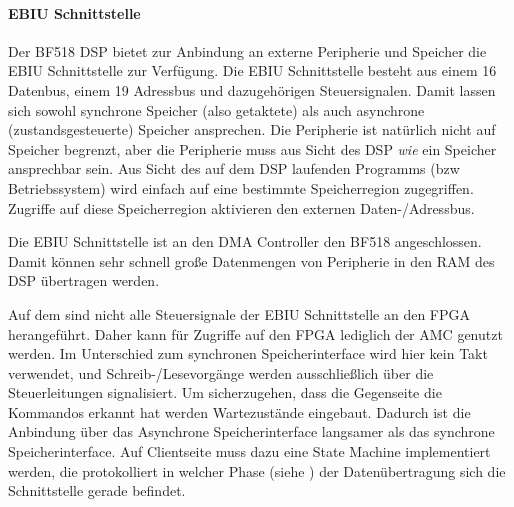 
\paragraph{EBIU Schnittstelle}
Der BF518 DSP bietet zur Anbindung an externe Peripherie und Speicher die \gls{EBIU} Schnittstelle zur Verfügung. Die EBIU Schnittstelle besteht aus einem \SI{16}{\bit} Datenbus, einem \SI{19}{\bit} Adressbus und dazugehörigen Steuersignalen. Damit lassen sich sowohl synchrone Speicher (also getaktete) als auch asynchrone (zustandsgesteuerte) Speicher ansprechen. Die Peripherie ist natürlich nicht auf Speicher begrenzt, aber die Peripherie muss aus Sicht des DSP \emph{wie} ein Speicher ansprechbar sein. Aus Sicht des auf dem DSP laufenden Programms (bzw Betriebssystem) wird einfach auf eine bestimmte Speicherregion zugegriffen. Zugriffe auf diese Speicherregion aktivieren den externen Daten-/Adressbus.

Die EBIU Schnittstelle ist an den \gls{DMA} Controller den BF518 angeschlossen. Damit können sehr schnell große Datenmengen von Peripherie in den RAM des DSP übertragen werden.

Auf dem \comboard sind nicht alle Steuersignale der EBIU Schnittstelle an den FPGA herangeführt. Daher kann für Zugriffe auf den FPGA lediglich der \gls{AMC} genutzt werden. Im Unterschied zum synchronen Speicherinterface wird hier kein Takt verwendet, und Schreib-/Lesevorgänge werden ausschließlich über die Steuerleitungen signalisiert. Um sicherzugehen, dass die Gegenseite die Kommandos erkannt hat werden Wartezustände eingebaut. Dadurch ist die Anbindung über das Asynchrone Speicherinterface langsamer als das synchrone Speicherinterface. Auf Clientseite muss dazu eine State Machine implementiert werden, die protokolliert in welcher Phase (siehe ) der Datenübertragung sich die Schnittstelle gerade befindet.



